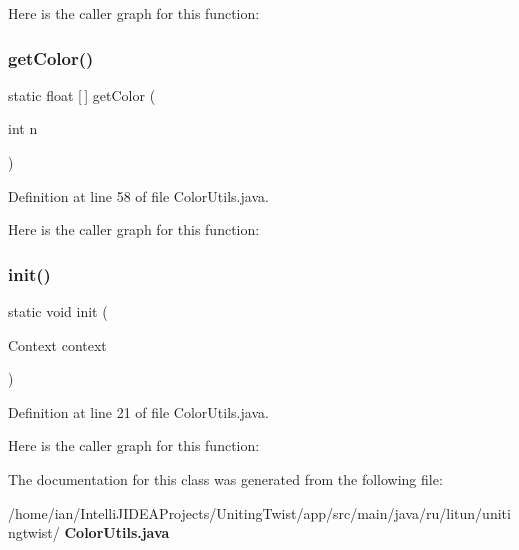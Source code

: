 Here is the caller graph for this function\+:
\mbox{\label{classsf_1_1unitingtwist_1_1_color_utils_aa3a7d7ee785a482b0ff389374266933a}} 
\subsubsection{get\+Color()}
{\footnotesize\ttfamily static float [$\,$] get\+Color (\begin{DoxyParamCaption}\item[{int}]{n }\end{DoxyParamCaption})\hspace{0.3cm}{\ttfamily [static]}}



Definition at line 58 of file Color\+Utils.\+java.

Here is the caller graph for this function\+:
\mbox{\label{classsf_1_1unitingtwist_1_1_color_utils_ad564b38011fb56e37ce0ae341781184d}} 
\subsubsection{init()}
{\footnotesize\ttfamily static void init (\begin{DoxyParamCaption}\item[{Context}]{context }\end{DoxyParamCaption})\hspace{0.3cm}{\ttfamily [static]}}



Definition at line 21 of file Color\+Utils.\+java.

Here is the caller graph for this function\+:


The documentation for this class was generated from the following file\+:\begin{DoxyCompactItemize}
\item 
/home/ian/\+Intelli\+J\+I\+D\+E\+A\+Projects/\+Uniting\+Twist/app/src/main/java/ru/litun/unitingtwist/\textbf{ Color\+Utils.\+java}\end{DoxyCompactItemize}
